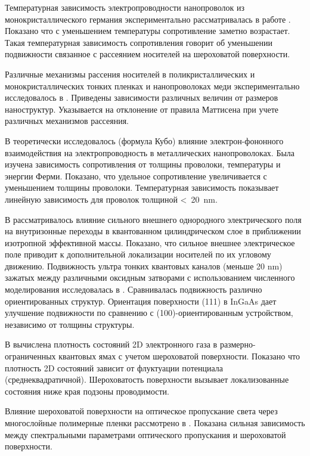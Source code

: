 Температурная зависимость электропроводности нанопроволок из монокристаллического германия экспериментально рассматривалась в работе \cite{Gu2001}. Показано что с уменьшением температуры сопротивление заметно возрастает. Такая температурная зависимость сопротивления говорит об уменьшении подвижности связанное с рассеянием носителей на шероховатой поверхности.

Различные механизмы рассения носителей в поликристаллических и монокристаллических тонких пленках и нанопроволоках меди экспериментально исследовалось в \cite{Chawla2011}. Приведены зависимости различных величин от размеров наноструктур. Указывается на отклонение от правила Маттисена при учете различных механизмов рассеяния.

В \cite{Lal2003} теоретически исследовалось (формула Кубо) влияние электрон-фононного взаимодействия на электропроводность в металлических нанопроволоках. Была изучена зависимость сопротивления от толщины проволоки, температуры и энергии Ферми. Показано, что удельное сопротивление увеличивается с уменьшением толщины проволоки. Температурная зависимость показывает линейную зависимость для проволок толщиной <~20~nm.

В \cite{Arutyunayan2010} рассматривалось влияние сильного внешнего однородного электрического поля на внутризонные переходы в квантованном цилиндрическом слое в приближении изотропной эффективной массы. Показано, что сильное внешнее электрическое поле приводит к дополнительной локализации носителей по их угловому движению.
Подвижность ультра тонких квантовых каналов (меньше 20 nm) зажатых между различными оксидным затворами с использованием численного моделирования исследовалась в \cite{Krivec2016}. Сравнивалась подвижность различно ориентированных структур. Ориентация поверхности (111) в InGaAs дает улучшение подвижности по сравнению с (100)-ориентированным устройством, независимо от толщины структуры.

В \cite{Thongnum2008} вычислена плотность состояний 2D электронного газа в размерно-ограниченных квантовых ямах с учетом шероховатой поверхности.  Показано что плотность 2D состояний зависит от флуктуации потенциала (среднеквадратичной). Шероховатость поверхности вызывает локализованные состояния ниже края подзоны проводимости.

Влияние шероховатой поверхности на оптическое пропускание света через многослойные полимерные пленки рассмотрено в \cite{Larena2002}. Показана сильная зависимость между спектральными параметрами оптического пропускания и шероховатой поверхности.

